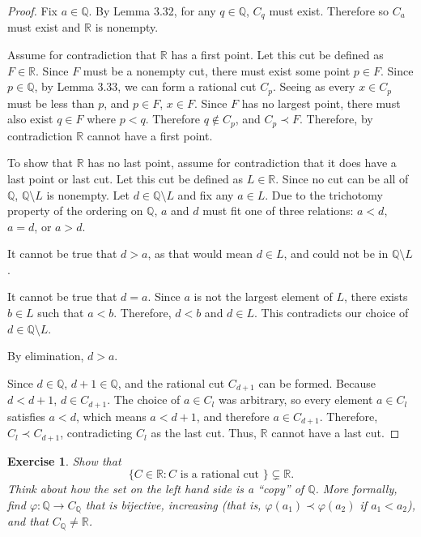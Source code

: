 \documentclass{amsart}
\newtheorem{exercise}[theorem]{Exercise}
\newcommand{\Q}{\mathbb Q}
\newcommand{\R}{\mathbb R}
\newcommand{\1}{\mathds{1}}
\def \R {{\mathbb {R}}}
\def \phi {{\varphi}}
\numberwithin{equation}{section}
\numberwithin{theorem}{section}
\begin{document}
\begin{proof}
	Fix $a\in\Q$. By Lemma 3.32, for any $q\in\Q$, $C_q$ must exist. Therefore so $C_a$ must exist and $\R$ is nonempty.
	
	Assume for contradiction that $\R$ has a first point. Let this cut be defined as $F\in\R$. Since $F$ must be a nonempty cut, there must exist some point $p\in F$. Since $p\in \Q$, by Lemma 3.33, we can form a rational cut $C_p$. Seeing as every $x\in C_p$ must be less than $p$, and $p\in F$, $x\in F$. Since $F$ has no largest point, there must also exist $q\in F$ where $p<q$. Therefore $q\notin C_p$, and $C_p \prec F$. Therefore, by contradiction $\R$ cannot have a first point.
	
	To show that $\R$ has no last point, assume for contradiction that it does have a last point or last cut. Let this cut be defined as $L\in\R$. Since no cut can be all of $\Q$, $\Q\setminus L$ is nonempty. Let $d\in \Q\setminus L$ and fix any $a\in L$. Due to the trichotomy property of the ordering on $\Q$, $a$ and $d$ must fit one of three relations: $a<d$, $a=d$, or $a>d$.
	
	It cannot be true that $d>a$, as that would mean $d\in L$, and could not be in $\Q\setminus L$. 
	
	It cannot be true that $d=a$. Since $a$ is not the largest element of $L$, there exists $b\in L$ such that $a<b$. Therefore, $d<b$ and $d\in L$. This contradicts our choice of $d\in\Q\setminus L$.
	
	By elimination, $d>a$.
	
	Since $d\in \Q$, $d+1\in\Q$, and the rational cut $C_{d+1}$ can be formed. Because $d<d+1$, $d\in C_{d+1}$. The choice of $a\in C_l$ was arbitrary, so every element $a\in C_l$ satisfies $a<d$, which means $a<d+1$, and therefore $a\in C_{d+1}$. Therefore, $C_l\prec C_{d+1}$, contradicting $C_l$ as the last cut. Thus, $\R$ cannot have a last cut.
\end{proof}

\begin{exercise}
	Show that
	\[
	\{ C \in \R : C \text{ is a rational cut } \}
	\subsetneq \R.
	\]
	Think about how the set on the left hand side is a ``copy'' of $\Q$.  More formally, find $\phi: \Q \to C_\Q$ that is bijective, increasing (that is, $\phi(a_1) \prec \phi(a_2)$ if $a_1 < a_2$), and that $C_\Q \neq \R$.
\end{exercise}
\end{document}
